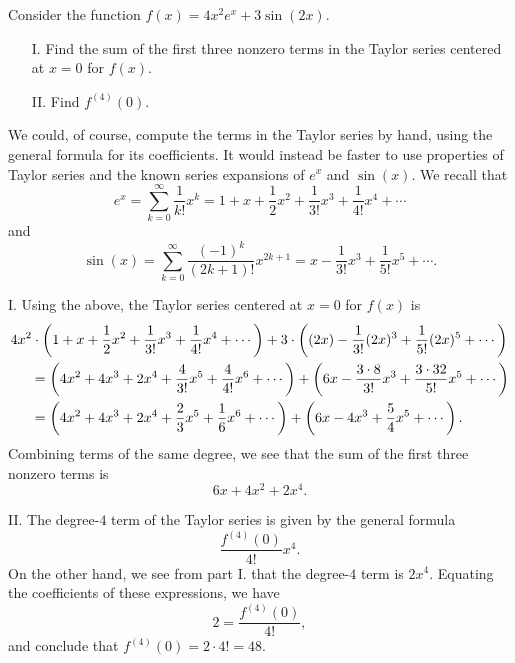 \documentclass[noauthor]{ximera}
\begin{document}
\begin{problem} 
Consider the function $f(x) = 4x^2e^x+3\sin(2x)$.

\begin{itemize}
\item[I.] Find the sum of the first three nonzero terms in the Taylor series centered at $x=0$ for $f(x)$.
\item[II.] Find $f^{(4)}(0)$.
\end{itemize}

\begin{freeResponse}
We could, of course, compute the terms in the Taylor series by hand, using the general formula for its coefficients. It would instead be faster to use properties of Taylor series and the known series expansions of $e^x$ and $\sin(x)$. We recall that 
$$
e^x = \sum_{k=0}^\infty \frac{1}{k!}x^k = 1 + x + \frac{1}{2} x^2 + \frac{1}{3!} x^3 + \frac{1}{4!}x^4 + \cdots
$$
and
$$
\sin(x) = \sum_{k=0}^\infty \frac{(-1)^k}{(2k+1)!} x^{2k+1} = x - \frac{1}{3!}x^3 + \frac{1}{5!}x^5 + \cdots.
$$

I. Using the above, the Taylor series centered at $x=0$ for $f(x)$ is
\begin{align*}
&4x^2 \cdot \left(1 + x + \frac{1}{2} x^2 + \frac{1}{3!} x^3 + \frac{1}{4!}x^4 + \cdots\right) + 3 \cdot \left((2x) - \frac{1}{3!}(2x)^3 + \frac{1}{5!}(2x)^5 + \cdots\right) \\
&\hspace{.2in} = \left(4x^2 + 4x^3 + 2x^4 + \frac{4}{3!} x^5 + \frac{4}{4!}x^6 + \cdots\right) + \left(6x - \frac{3 \cdot 8}{3!} x^3 + \frac{3 \cdot 32}{5!} x^5 + \cdots \right) \\
&\hspace{.2in} = \left(4x^2 + 4x^3 + 2x^4 + \frac{2}{3} x^5 + \frac{1}{6}x^6 + \cdots\right) + \left(6x - 4 x^3 + \frac{5}{4} x^5 + \cdots \right).
\end{align*}
Combining terms of the same degree, we see that the sum of the first three nonzero terms is
$$
6x + 4x^2 + 2x^4.
$$

II. The degree-$4$ term of the Taylor series is given by the general formula 
$$
\frac{f^{(4)}(0)}{4!} x^4.
$$
On the other hand, we see from part I. that the degree-$4$ term is $2x^4$. Equating the coefficients of these expressions, we have
$$
2 = \frac{f^{(4)}(0)}{4!},
$$
and conclude that $f^{(4)}(0) = 2 \cdot 4! = 48$.
\end{freeResponse}
\end{problem}
\end{document}
